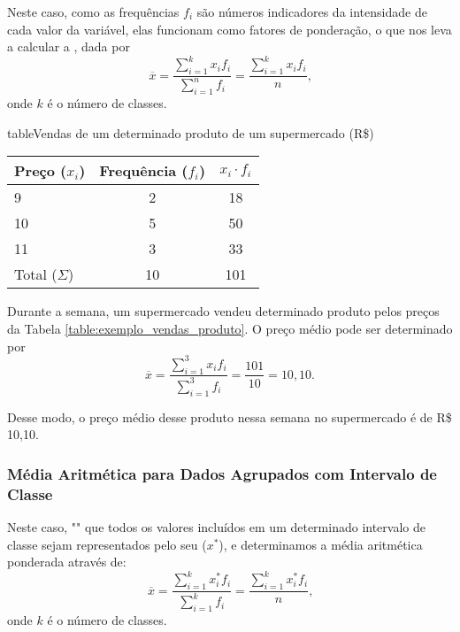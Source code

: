 \documentclass[11pt,fleqn]{book}
\numberwithin{mpicture}{chapter}
\numberwithin{mtable}{chapter}
\numberwithin{mframe}{chapter}
\begin{document}
Neste caso, como as frequências $f_i$ são números indicadores da intensidade de cada valor da variável, elas funcionam como fatores de ponderação, o que nos leva a calcular a , dada por
\[
	\overline{x}=\frac{
		\displaystyle \sum_{i=1}^{k} x_i f_i
	}{
		\displaystyle \sum_{i=1}^{n} f_i
	}
	= \frac{
		\displaystyle \sum_{i=1}^{k} x_i f_i
	}{
		n
	}
	\text{,}
\]
onde $k$ é o número de classes.

\begin{sidepicture}{10pt}{table}{Vendas de um determinado produto de um supermercado (R\$)}
	\label{table:exemplo_vendas_produto}
	\begin{tabular}{lcc}\\\toprule
		Preço ($x_i$) & Frequência ($f_i$) & $x_i\cdot f_i$ \\ \midrule
		9 & 2 & 18 \\
		10 & 5 & 50 \\
		11 & 3 & 33 \\ \midrule
		Total ($\Sigma$) & 10 & 101 \\ \bottomrule
	\end{tabular}
\end{sidepicture}

\begin{example}
	Durante a semana, um supermercado vendeu determinado produto pelos preços da Tabela \ref{table:exemplo_vendas_produto}. O preço médio pode ser determinado por
	\[
		\overline{x} = \frac{
			\displaystyle\sum_{i=1}^{3} x_i f_i
		}{
			\displaystyle\sum_{i=1}^{3} f_i
		}
		=
		\frac{101}{10}
		=10,10\text{.}
	\]
	
	Desse modo, o preço médio desse produto nessa semana no supermercado é de R\$ 10,10.
\end{example}

\subsubsection{Média Aritmética para Dados Agrupados com Intervalo de Classe}

Neste caso, "" que todos os valores incluídos em um determinado intervalo de classe sejam representados pelo seu  ($x^{*}$), e determinamos a média aritmética ponderada através de:
\[
	\overline{x}=\frac{	
		\displaystyle \sum_{i=1}^{k} x_i^{*} f_i
	}{
		\displaystyle \sum_{i=1}^{k} f_i
	}
	= \frac{
		\displaystyle \sum_{i=1}^{k} x_i^{*} f_i
	}{
		n
	}
	\text{,}
\]
onde $k$ é o número de classes.
\end{document}
